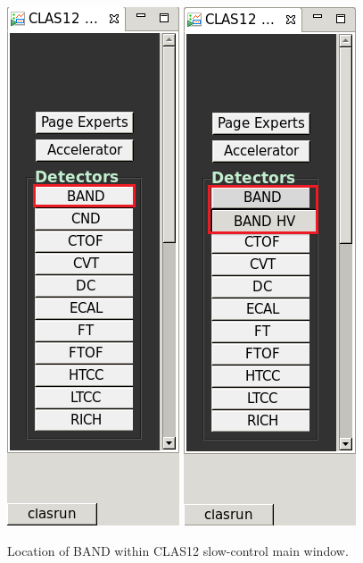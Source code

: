 \documentclass[12pt,letterpaper]{article}
\begin{document}
\begin{figure}
\centering
{\includegraphics[width=.15\textwidth]{CLASMenuBAND.png}}
{\includegraphics[width=.15\textwidth]{CLASMenuSubBAND.png}}

\caption{Location of BAND within CLAS12 slow-control main window.}
\label{fig:CLASMenu}
\end{figure}
\end{document}
